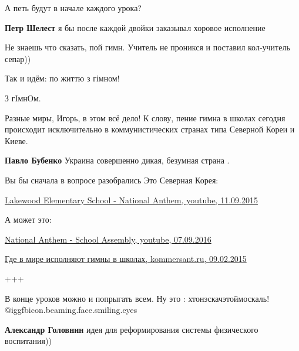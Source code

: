 \begin{itemize}
\begin{itemize}
\end{itemize} %

А петь будут в начале каждого урока?

\begin{itemize} %
\textbf{Петр Шелест} я бы после каждой двойки заказывал хоровое исполнение

Не знаешь что сказать, пой гимн. Учитель не проникся и поставил кол-учитель сепар))
\end{itemize} %

Так и идём: по життю з гімном!

\begin{itemize} %
З гIмнОм.
\end{itemize} %


Разные миры, Игорь, в этом всё дело! К слову, пение гимна в школах сегодня
происходит исключительно в коммунистических странах типа Северной Кореи и
Киеве.

\begin{itemize} %
\textbf{Павло Бубенко} Украина совершенно дикая, безумная страна .


Вы бы сначала в вопросе разобрались
Это Северная Корея: 

\href{https://www.youtube.com/watch?v=M9b0ymIqmSc}{%
Lakewood Elementary School - National Anthem, youtube, 11.09.2015%
}

А может это: 

\href{https://www.youtube.com/watch?v=xXK-_nzk4Hc}{%
National Anthem - School Assembly, youtube, 07.09.2016%
}

\href{https://www.kommersant.ru/doc/2663954}{%
Где в мире исполняют гимны в школах, kommersant.ru, 09.02.2015%
}

\end{itemize} %

+++


В конце уроков можно и попрыгать всем. Ну это : хтонэскачэтоймоскаль!  @igg{fbicon.beaming.face.smiling.eyes} 

\begin{itemize} %
\textbf{Александр Головнин} идея для реформирования системы физического воспитания))
\end{itemize} %


\end{itemize}
